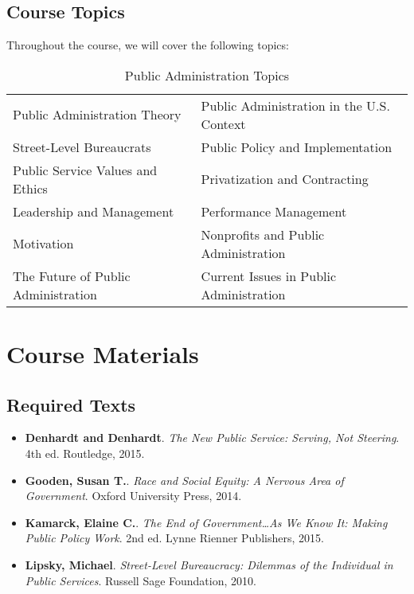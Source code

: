 \documentclass[12pt, letterpaper]{article}
\begin{document}
    \subsection*{Course Topics}
    Throughout the course, we will cover the following topics:
    \begin{table}[h]
        \centering
        \caption{Public Administration Topics}
        \begin{tabular}{ll}\hline
            Public Administration Theory & Public Administration in the U.S. Context \\
            Street-Level Bureaucrats & Public Policy and Implementation \\
            Public Service Values and Ethics & Privatization and Contracting \\
            Leadership and Management & Performance Management \\
            Motivation & Nonprofits and Public Administration \\
            The Future of Public Administration & Current Issues in Public Administration \\ \hline
        \end{tabular}
        \label{tab:pa_topics}
        \end{table}
    
    \section{Course Materials}
    \subsection*{Required Texts}
    \begin{itemize}
        \item \textbf{Denhardt and Denhardt}. \textit{The New Public Service: Serving, Not Steering}. 4th ed. Routledge, 2015.
        \item \textbf{Gooden, Susan T.}. \textit{Race and Social Equity: A Nervous Area of Government}. Oxford University Press, 2014.
        \item \textbf{Kamarck, Elaine C.}. \textit{The End of Government…As We Know It: Making Public Policy Work}. 2nd ed. Lynne Rienner Publishers, 2015.
        \item \textbf{Lipsky, Michael}. \textit{Street-Level Bureaucracy: Dilemmas of the Individual in Public Services}. Russell Sage Foundation, 2010.
    \end{itemize}
\end{document}
